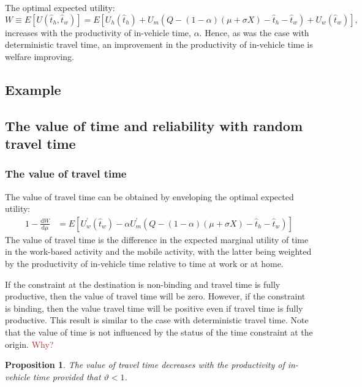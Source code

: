 \documentclass[12pt,a4paper,british]{article}
\newtheorem{prop}{Proposition}[section]
\begin{document}
The optimal expected utility: 
\begin{equation*}
W\equiv E\left[U\left(\hat{t}_{h},\hat{t}_{w}\right)\right]=E\left[U_{h}\left(\hat{t}_{h}\right)+U_{m}\left(Q-\left(1-\alpha\right)\left(\mu+\sigma X\right)-\hat{t}_{h}-\hat{t}_{w}\right)+U_{w}\left(\hat{t}_{w}\right)\right],
\end{equation*}
increases with the productivity of in-vehicle time, $\alpha$. Hence, as was the case with deterministic travel time, an improvement in
the productivity of in-vehicle time is welfare improving.

\subsection*{Example}

\subsection{The value of time and reliability with random travel time}

\subsubsection*{The value of travel time}

The value of travel time can be obtained by enveloping the optimal expected utility:
\begin{alignat*}{1}
-\frac{\mathrm{d}W}{\mathrm{d}\mu} & =E\left[U_{w}^{\prime}\left(\hat{t}_{w}\right)-\alpha U_{m}^{\prime}\left(Q-\left(1-\alpha\right)\left(\mu+\sigma X\right)-\hat{t}_{h}-\hat{t}_{w}\right)\right]
\end{alignat*}
The value of travel time is the difference in the expected marginal utility of time in the work-based activity and the mobile activity,
with the latter being weighted by the productivity of in-vehicle time relative to time at work or at home. 

If the constraint at the destination is non-binding and travel time is fully productive, then the value of travel time will be zero. However, if the constraint is binding, then the value travel time will be positive even if travel time is fully productive. This result is similar to the case with deterministic travel time. Note that the value of time is not influenced by the status of the time constraint at the origin.
\textcolor{brown}{Why?}
\begin{prop}
The value of travel time decreases with the productivity of in-vehicle time provided that $\vartheta<1$. 
\end{prop}
\end{document}
